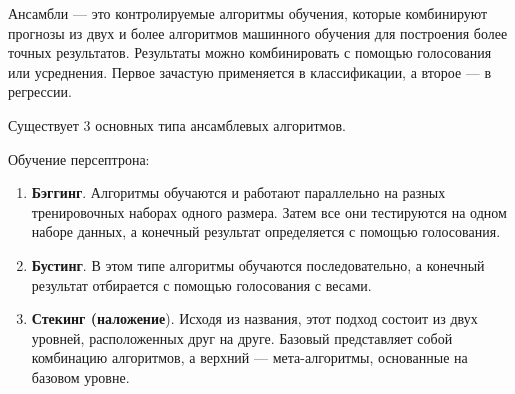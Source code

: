 Ансамбли --- это контролируемые алгоритмы обучения, которые комбинируют
прогнозы из двух и более алгоритмов машинного обучения для построения более
точных результатов. Результаты можно комбинировать с помощью голосования или
усреднения. Первое зачастую применяется в классификации, а второе --- в
регрессии.

Существует 3 основных типа ансамблевых алгоритмов.

Обучение персептрона:
\begin{enumerate}[label*=\arabic*.]
	\item \textbf{Бэггинг}. Алгоритмы обучаются и работают параллельно на разных
	тренировочных наборах одного размера. Затем все они тестируются на одном
	наборе данных, а конечный результат определяется с помощью голосования.
	\item \textbf{Бустинг}. В этом типе алгоритмы обучаются последовательно, а конечный
	результат отбирается с помощью голосования с весами.
	\item \textbf{Стекинг (наложение}). Исходя из названия, этот подход состоит из двух уровней,
	расположенных друг на друге. Базовый представляет собой комбинацию
	алгоритмов, а верхний --- мета-алгоритмы, основанные на базовом уровне.
\end{enumerate}



\clearpage
